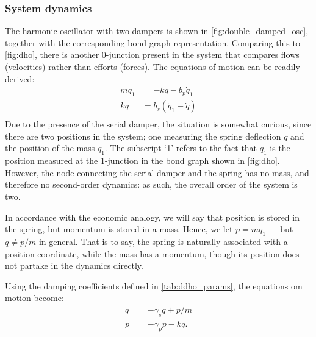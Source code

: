 \subsubsection{System dynamics}
The harmonic oscillator with two dampers is shown in \cref{fig:double_damped_osc}, together with the corresponding bond graph representation. Comparing this to \cref{fig:dho}, there is another 0-junction present in the system that compares flows (velocities) rather than efforts (forces). The equations of motion can be readily derived:
\begin{equation}
    \begin{split}
        m\ddot{q}_1 &= -kq - b_p \dot{q}_1 \\
        kq &= b_s(\dot{q}_1 - \dot{q}) \\
    \end{split}
    \label{eq:serial_eom_raw}
\end{equation}
Due to the presence of the serial damper, the situation is somewhat curious, since there are two positions in the system; one measuring the spring deflection $q$ and the position of the mass $q_1$. The subscript `1' refers to the fact that $q_1$ is the position measured at the 1-junction in the bond graph shown in \cref{fig:dho}. However, the node connecting the serial damper and the spring has no mass, and therefore no second-order dynamics: as such, the overall order of the system is two. 

In accordance with the economic analogy, we will say that position is stored in the spring, but momentum is stored in a mass.
Hence, we let $p = m\dot{q}_1$ --- but $\dot{q} \neq p/m$ in general. That is to say, the spring is naturally associated with a position coordinate, while the mass has a momentum, though its position does not partake in the dynamics directly.

Using the damping coefficients defined in \cref{tab:ddho_params}, the equations om motion become:
\begin{equation}
    \begin{split}
        \dot{q} &= -\gamma_s q + p/m  \\
        \dot{p} &= -\gamma_p p - kq.
    \end{split}
    \label{eq:serial_eom_pq}
\end{equation}

